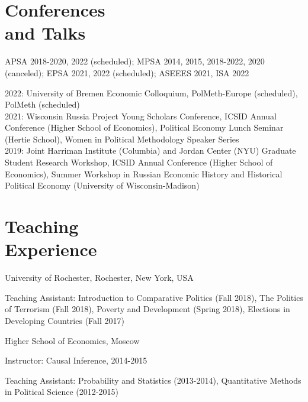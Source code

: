 \documentclass[margin,line,11pt]{res}
\newenvironment{list1}{
  \begin{list}{\ding{113}}{%
      \setlength{\itemsep}{0in}
      \setlength{\parsep}{0in} \setlength{\parskip}{0in}
      \setlength{\topsep}{0in} \setlength{\partopsep}{0in}
      \setlength{\leftmargin}{0.17in}}}{\end{list}}
\begin{document}
\begin{resume}
\section{\sc Conferences \\ and Talks}

APSA 2018-2020, 2022 (scheduled); MPSA 2014, 2015, 2018-2022, 2020 (canceled); EPSA 2021, 2022 (scheduled); ASEEES 2021, ISA 2022
  \vspace*{-4.5mm} 

2022: University of Bremen Economic Colloquium, PolMeth-Europe (scheduled), PolMeth (scheduled)
\\
2021: Wisconsin Russia Project Young Scholars Conference, ICSID Annual Conference (Higher School of Economics), Political Economy Lunch Seminar (Hertie School), Women in Political Methodology Speaker Series
\\
2019: Joint Harriman Institute (Columbia) and Jordan Center (NYU) Graduate Student Research Workshop,  ICSID Annual Conference (Higher School of Economics), Summer Workshop in Russian Economic History and Historical Political Economy (University of Wisconsin-Madison) 


\section{\sc Teaching \\ Experience}

{University of Rochester}, Rochester, New York, USA\\
\vspace*{-.1in}
\begin{list1}
\item[] Teaching Assistant: Introduction to Comparative Politics (Fall 2018),  The Politics of Terrorism (Fall 2018), Poverty and Development (Spring 2018), Elections in Developing Countries (Fall 2017) 
\end{list1}

\vspace{-3mm}
{Higher School of Economics, Moscow}\\
\vspace*{-.1in}
\begin{list1}
	\item[] Instructor: Causal Inference, 2014-2015
	\item[] Teaching Assistant: Probability and Statistics (2013-2014), Quantitative Methods in Political Science (2012-2015)
\end{list1}


\end{resume}
\end{document}
